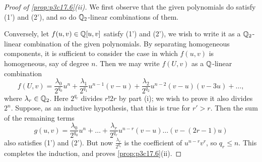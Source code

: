 \documentclass[../main]{subfiles}
\begin{document}
\begin{proof}[Proof of \ref{prop:p3c17.6}(ii)]
We first observe that the given polynomials do satisfy (1') and (2'), and so do $\mathbb{Q}_2$-linear combinations of them.

Conversely, let $f(u, v) \in \mathbb{Q}[u, v]$ satisfy (1') and (2'), we wish to write it as a $\mathbb{Q}_2$-linear combination of the given polynomials. By separating homogeneous components, it is sufficient to consider the case in which $f(u, v)$ is homogeneous, say of degree $n$. Then we may write $f(U, v)$ as a $\mathbb{Q}$-linear combination $$f(U, v) = \frac {\lambda_0} {2^{q_0}} u^n + \frac {\lambda_1} {2^{q_1}} u^{n - 1}(v - u) + \frac {\lambda_2} {2^{q_2}} u^{n - 2} (v - u) (v - 3u) + \ldots,$$ where $\lambda_r \in \mathbb{Q}_2$. Here $2^{q_r}$ divides $r! 2r$ by part (i); we wish to prove it also divides $2^n$. Suppose, as an inductive hypothesis, that this is true for $r' > r$. Then the sum of the remaining terms $$g(u,v) = \frac {\lambda_0} {2^{q_0}} u^n + \ldots + \frac {\lambda_r} {2^{q_r}} u^{n - r}(v - u) \ldots (v - (2r - 1)u)$$ also satisfies (1') and (2'). But now $\displaystyle \frac {\lambda_r} {2^{q_r}}$ is the coefficient of $u^{n - r} v^r$, so $q_r \le n$. This completes the induction, and proves \ref{prop:p3c17.6}(ii).
\end{proof}
\end{document}
